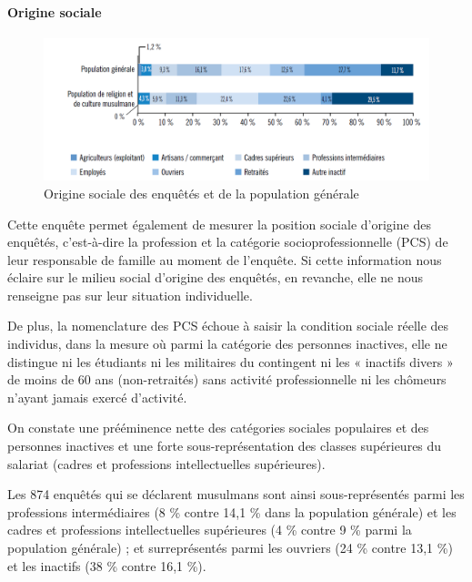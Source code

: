 \paragraph{Origine sociale}



\begin{figure}
    \centering
    \includegraphics[width=\textwidth]{ImageIslamFrance/OrigineSociale.png}
    \caption{Origine sociale des enquêtés et de la population générale}
    \label{fig:my_label}
\end{figure}

Cette enquête permet également de mesurer la position sociale d'origine
des enquêtés, c'est-à-dire la profession et la catégorie
socioprofessionnelle (PCS) de leur responsable de famille au moment de
l'enquête. Si cette information nous éclaire sur le milieu social
d'origine des enquêtés, en revanche, elle ne nous renseigne pas sur leur
situation individuelle.

De plus, la nomenclature des PCS échoue à saisir la condition sociale
réelle des individus, dans la mesure où parmi la catégorie des personnes
inactives, elle ne distingue ni les étudiants ni les militaires du
contingent ni les « inactifs divers » de moins de 60 ans (non-retraités)
sans activité professionnelle ni les chômeurs n'ayant jamais exercé
d'activité.

On constate une prééminence nette des catégories sociales populaires et
des personnes inactives et une forte sous-représentation des classes
supérieures du salariat (cadres et professions intellectuelles
supérieures).

Les 874 enquêtés qui se déclarent musulmans sont ainsi sous-représentés
parmi les professions intermédiaires (8 \% contre 14,1 \% dans la
population générale) et les cadres et professions intellectuelles
supérieures (4 \% contre 9 \% parmi la population générale) ; et
surreprésentés parmi les ouvriers (24 \% contre 13,1 \%) et les inactifs
(38 \% contre 16,1 \%).




